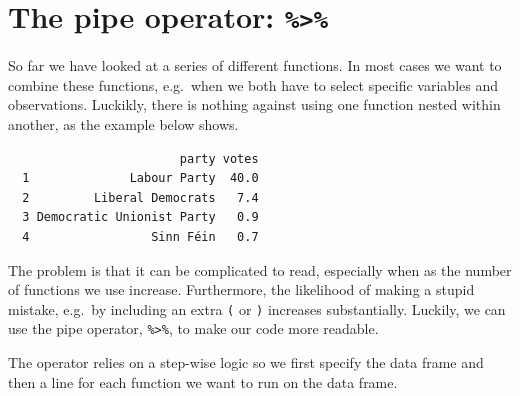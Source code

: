 \documentclass[12pt,oneside]{reedthesis}
\theoremstyle{definition}
\theoremstyle{definition}
\theoremstyle{definition}
\theoremstyle{remark}
\begin{document}
  \section{\texorpdfstring{The pipe operator:
  \texttt{\%\textgreater{}\%}}{The pipe operator: \%\textgreater{}\%}}\label{the-pipe-operator}
  
  So far we have looked at a series of different functions. In most cases
  we want to combine these functions, e.g.~when we both have to select
  specific variables and observations. Luckikly, there is nothing against
  using one function nested within another, as the example below shows.
  \begin{Shaded}
  \begin{Highlighting}[]
  \NormalTok{(}\OperatorTok{>}\StringTok{ }\NormalTok{)}
  \end{Highlighting}
  \end{Shaded}
  \begin{verbatim}
                        party votes
  1              Labour Party  40.0
  2         Liberal Democrats   7.4
  3 Democratic Unionist Party   0.9
  4                 Sinn Féin   0.7
  \end{verbatim}
  The problem is that it can be complicated to read, especially when as
  the number of functions we use increase. Furthermore, the likelihood of
  making a stupid mistake, e.g.~by including an extra \texttt{(} or
  \texttt{)} increases substantially. Luckily, we can use the pipe
  operator, \texttt{\%\textgreater{}\%}, to make our code more readable.
  
  The operator relies on a step-wise logic so we first specify the data
  frame and then a line for each function we want to run on the data
  frame.
  
\end{document}
